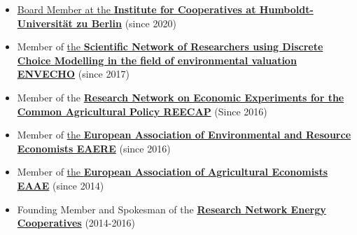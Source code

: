 \documentclass[paper=a4,fontsize=11pt]{scrartcl} %
\begin{document}
\begin{itemize}

\item{\href{https://www.agrar.hu-berlin.de/de/institut/departments/daoe/koopwiss/ifg/Institut/vorstand_mitglieder}{Board Member at the \textbf{Institute for Cooperatives at Humboldt-Universität zu Berlin}}} (since 2020)

\item Member of \href{http://www.envecho.com/index.html}{the \textbf{Scientific Network of Researchers using Discrete Choice Modelling in the field of environmental valuation ENVECHO}} (since 2017) 

\item Member of the \href{https://sites.google.com/view/reecap}{\textbf{Research Network on Economic Experiments for the Common Agricultural Policy REECAP}} (Since 2016)

\item Member of {\href{https://www.eaere.org/}{ the \textbf{European Association of Environmental and Resource Economists EAERE}}} (since 2016)

\item Member of {\href{https://eaae.org/}{the \textbf{European Association of Agricultural Economists EAAE}}} (since 2014)

\item Founding Member and Spokesman of the {\href{http://forschungsnetzwerk-energiegenossenschaften.de}{\textbf{Research Network Energy Cooperatives}}} (2014-2016)

\end{itemize}
\end{document}
